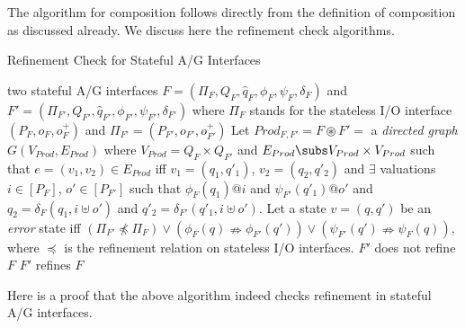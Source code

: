 The algorithm for composition follows directly from the definition of
composition as discussed already. We discuss here the refinement check
algorithms.

\begin{algorithm}[ht]
\caption{Refinement Check for Stateful A/G Interfaces} \label{algo1}
\begin{algorithmic}[1]
\REQUIRE two stateful A/G interfaces 
$F = (\Pi_F,Q_F,\hat{q}_F,\phi_F,\psi_F,\delta_F)$ and
$F' = (\Pi_{F'},Q_{F'},\hat{q}_{F'},\phi_{F'},\psi_{F'},\delta_{F'})$
where $\Pi_F$ stands for the stateless I/O interface $(P_F,o_F,o^+_F)$ and
$\Pi_{F'} = (P_{F'},o_{F'},o^+_{F'})$ 
\STATE Let $Prod_{F,F'} = F \circledast F' =$ a \emph{directed graph} 
$G(V_{Prod},E_{Prod})$ where 
$V_{Prod} = Q_F \times Q_{F'}$ and $E_{Prod} \subs V_{Prod} \times V_{Prod}$
such that $e = (v_1,v_2) \in E_{Prod}$ iff $v_1 = (q_1,q'_1)$, $v_2 = (q_2,q'_2)$
and $\exists$ valuations $i \in [P_F]$, $o' \in [P_{F'}]$ such that 
$\phi_F(q_1) @ i$ and $\psi_{F'}(q'_1) @ o'$ and $q_2 = \delta_F(q_1,i \uplus o')$
and $q'_2 = \delta_{F'}(q'_1,i \uplus o')$.
\STATE Let a state $v = (q,q')$ be an {\em error} state iff 
$(\Pi_{F'} \npreceq \Pi_F) \lor (\phi_F(q) \nRightarrow \phi_{F'}(q')) \lor 
(\psi_{F'}(q') \nRightarrow \psi_F(q))$, where $\preceq$ is the refinement 
relation on stateless I/O interfaces.
\STATE $F'$ does not refine $F$
\ELSE
\STATE $F'$ refines $F$
\ENDIF
\end{algorithmic}
\end{algorithm}

Here is a proof that the above algorithm indeed checks refinement in stateful
A/G interfaces.

